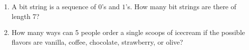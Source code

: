 \documentclass[../../Main.tex]{subfiles}
\begin{document}
\begin{example}
\begin{enumerate}
{\begin{alphabet}
{                    \begin{align*}
                        \text{\# Dina next to Omar} + \text{\# Dina NOT next to Omar} &= \text{total} \\
                        \text{\# Dina NOT next to Omar} &= \text{total} - \text{\# Dina next to Omar} \\
                        &= 5040 - 1440 \\
                        &= \boxed{3600} \\
                    \end{align*}
                }
            \end{alphabet}
        }

        \item 
        {
            A bit string is a sequence of $0$'s and $1$'s. How many bit strings are there of length 7?

        }

        \item
        {
            How many ways can 5 people order a single scoops of icecream if the possible flavors are vanilla, coffee, chocolate, strawberry, or olive?

}
\end{enumerate}
\end{example}
\end{document}
